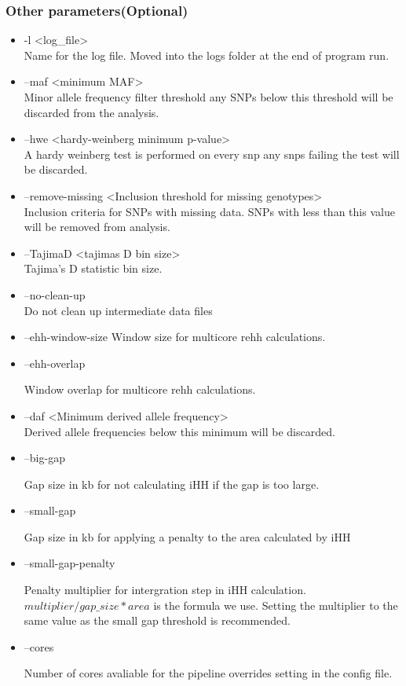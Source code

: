 \documentclass[a4paper,10pt]{article}
\begin{document}
\subsubsection{Other parameters(Optional)}
\begin{itemize}
\item -l <log\_file> \\
Name for the log file. Moved into the logs folder at the end of program run.
\item --maf <minimum MAF>\\
Minor allele frequency filter threshold any SNPs below this threshold will be discarded from the analysis.
\item --hwe <hardy-weinberg minimum p-value>\\
A hardy weinberg test is performed on every snp any snps failing the test will be discarded.
\item --remove-missing <Inclusion threshold for missing genotypes>\\
Inclusion criteria for SNPs with missing data. SNPs with less than this value will be removed from analysis.
\item --TajimaD <tajimas D bin size>\\
Tajima's D statistic bin size.
\item --no-clean-up \\
Do not clean up intermediate data files

\item --ehh-window-size
Window size for multicore rehh calculations.  

\item --ehh-overlap

Window overlap for multicore rehh calculations.

\item --daf <Minimum derived allele frequency>\\
Derived allele frequencies below this minimum will be discarded.

\item --big-gap

Gap size in kb for not calculating iHH if the gap is too large.

\item --small-gap

Gap size in kb for applying a penalty to the area calculated by iHH

\item --small-gap-penalty

Penalty multiplier for intergration step in iHH calculation. $multiplier/gap\_size * area$ is the formula we use. Setting the multiplier to the same value as the small gap threshold is recommended.

\item --cores 

Number of cores avaliable for the pipeline overrides setting in the config file.

\end{itemize}
\end{document}
